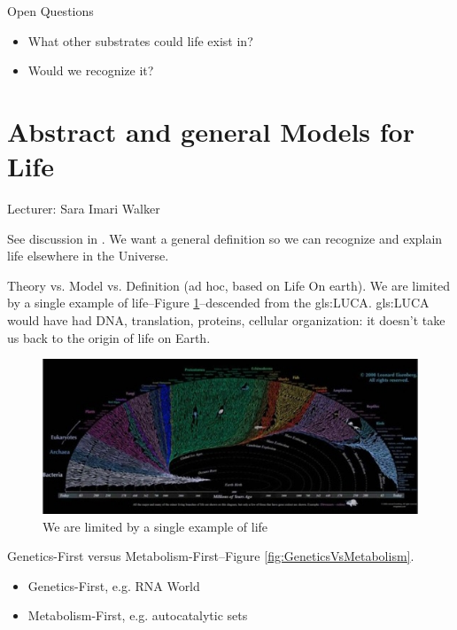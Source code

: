 \documentclass[]{article}
\begin{document}
Open Questions

\begin{itemize}
	\item What other substrates could life exist in?
	\item Would we recognize it?
\end{itemize}



\section{Abstract and general Models for Life}

Lecturer: Sara Imari Walker

See discussion in \cite{trifonov2011vocabulary}. We want a general definition so we can recognize and explain life elsewhere in the Universe.

Theory vs. Model vs. Definition (ad hoc, based on Life On earth). We are limited by a single example of life--Figure \ref{fig:yatol}--descended from the \gls{gls:LUCA}. \gls{gls:LUCA} would have had DNA, translation, proteins, cellular organization: it doesn't take us back to the origin of life on Earth.

\begin{figure}[H]
	\caption{We are limited by a single example of life}\label{fig:yatol}
	\includegraphics[width=\textwidth]{YATOL}
\end{figure}

Genetics-First versus Metabolism-First--Figure \ref{fig:GeneticsVsMetabolism}.

\begin{itemize}
	\item Genetics-First, e.g. RNA World
	\item Metabolism-First, e.g. autocatalytic sets
\end{itemize}
\end{document}
